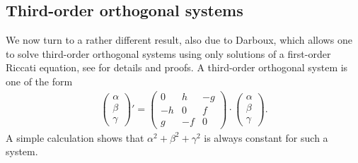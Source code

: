 \documentclass[10pt,a4paper]{amsart}
\numberwithin{equation}{section}
\begin{document}
\subsection{Third-order orthogonal systems}
We now turn to a rather different result, also due to Darboux, which allows one to solve third-order orthogonal systems using only solutions of a first-order Riccati equation, see
\cite[Part~I, Chapter~II]{da3} for details and proofs.
A third-order orthogonal system is one of the form
\begin{gather*}
 \begin{pmatrix} \alpha \\ \beta \\ \gamma \end{pmatrix}' = \begin{pmatrix} 0 & h & -g \\ -h & 0 & f \\ g & -f & 0 \end{pmatrix} \cdot \begin{pmatrix} \alpha \\ \beta \\ \gamma \end{pmatrix}\!.
\end{gather*}
A simple calculation shows that $\alpha^2+\beta^2+\gamma^2$ is always constant for such a system.
\end{document}

